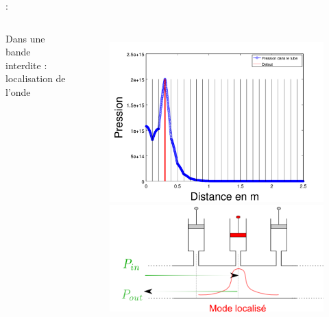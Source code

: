 \documentclass[12pt,xcolor=x11names,compress, notes=show]{beamer}%
\begin{document}
\begin{frame}{\insertsectionhead : \insertsubsectionhead}
\begin{columns}[T]
	 Dans une bande interdite : localisation de l'onde
	\begin{figure}
		\centering
		\includegraphics[width=\textwidth]{visu_pression_favo2.png}\\
		\includegraphics[width=0.7 \textwidth]{schema_singu2.png}
	\end{figure}
\end{columns}



\end{frame}
\end{document}
